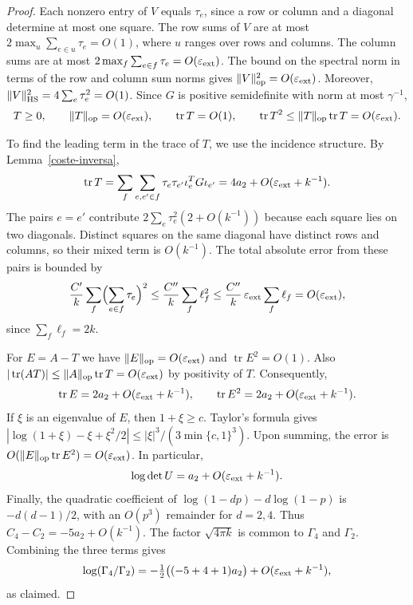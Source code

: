 \begin{proof}
Each nonzero entry of $V$ equals $\tau_e$, since a row or column and a diagonal determine at most
one square. The row sums of $V$ are at most $2\max_u\sum_{e\in u}\tau_e=O(1)$, where $u$ ranges
over rows and columns. The column sums are at most $2\max_f\sum_{e\in f}\tau_e=O(\varepsilon_{\rm ext})$.
The bound on the spectral norm in terms of the row and column sum norms gives
$\|V\|_{\rm op}^2=O(\varepsilon_{\rm ext})$. Moreover,
$\|V\|_{\rm HS}^2=4\sum_e\tau_e^2=O(1)$. Since $G$ is positive semidefinite with norm at most
$\gamma^{-1}$,
\[
 T\ge0,\qquad \|T\|_{\rm op}=O(\varepsilon_{\rm ext}),\qquad
 \operatorname{tr}T=O(1),\qquad
 \operatorname{tr}T^2\le\|T\|_{\rm op}\operatorname{tr}T
             =O(\varepsilon_{\rm ext}) .
\]

To find the leading term in the trace of $T$, we use the incidence structure.
By Lemma~\ref{coste-inversa},
\[
 \operatorname{tr}T
 =\sum_f\sum_{e,e'\in f}\tau_e\tau_{e'}\iota_e^TG\iota_{e'}
 =4a_2+O(\varepsilon_{\rm ext}+k^{-1}) .
\]
The pairs $e=e'$ contribute $2\sum_e\tau_e^2(2+O(k^{-1}))$ because each square lies on two
diagonals. Distinct squares on the same diagonal have distinct rows and columns, so their mixed
term is $O(k^{-1})$. The total absolute error from these pairs is bounded by
\[
 \frac{C'}k\sum_f\Bigl(\sum_{e\in f}\tau_e\Bigr)^2
 \le\frac{C''}k\sum_f\ell_f^2
 \le\frac{C''}k\,\varepsilon_{\rm ext}\sum_f\ell_f
 =O(\varepsilon_{\rm ext}),
\]
since $\sum_f\ell_f=2k$.

For $E=A-T$ we have $\|E\|_{\rm op}=O(\varepsilon_{\rm ext})$ and $\operatorname{tr}E^2=O(1)$.
Also $|\operatorname{tr}(AT)|\le\|A\|_{\rm op}\operatorname{tr}T=O(\varepsilon_{\rm ext})$
by positivity of $T$. Consequently,
\[
 \operatorname{tr}E=2a_2+O(\varepsilon_{\rm ext}+k^{-1}),\qquad
 \operatorname{tr}E^2=2a_2+O(\varepsilon_{\rm ext}+k^{-1}).
\]
If $\xi$ is an eigenvalue of $E$, then $1+\xi\ge c$. Taylor's formula gives
$|\log(1+\xi)-\xi+\xi^2/2|\le|\xi|^3/(3\min\{c,1\}^3)$.
Upon summing, the error is $O(\|E\|_{\rm op}\operatorname{tr}E^2)=O(\varepsilon_{\rm ext})$.
In particular,
\[
 \log\det U=a_2+O(\varepsilon_{\rm ext}+k^{-1}).
\]
Finally, the quadratic coefficient of $\log(1-dp)-d\log(1-p)$ is $-d(d-1)/2$, with an $O(p^3)$
remainder for $d=2,4$. Thus $C_4-C_2=-5a_2+O(k^{-1})$. The factor $\sqrt{4\pi k}$ is common
to $\Gamma_4$ and $\Gamma_2$. Combining the three terms gives
\[
 \log(\Gamma_4/\Gamma_2)
 =-\tfrac12\bigl((-5+4+1)a_2\bigr)
      +O(\varepsilon_{\rm ext}+k^{-1}),
\]
as claimed.
\end{proof}

